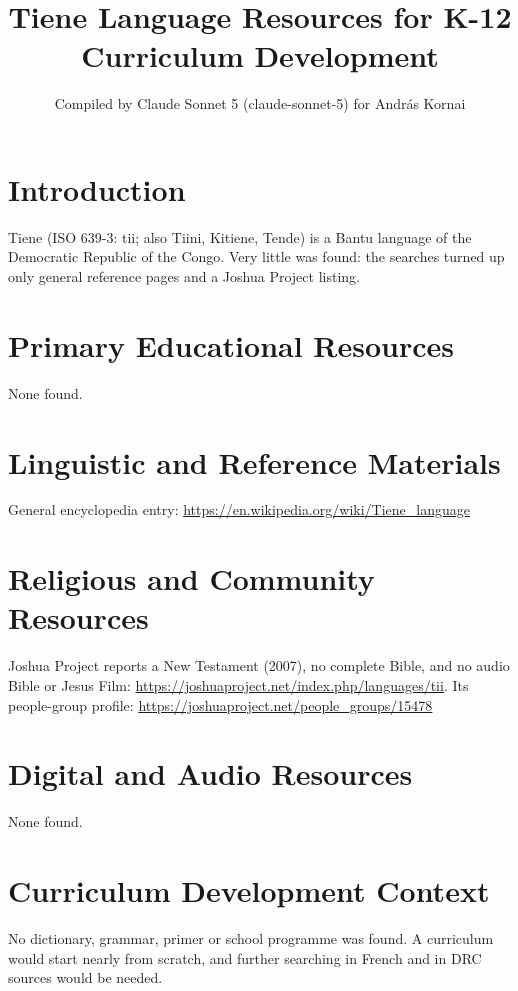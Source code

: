 \documentclass[12pt]{article}
\title{Tiene Language Resources for K-12 Curriculum Development}
\author{Compiled by Claude Sonnet 5 (claude-sonnet-5) for Andr\'as Kornai}
\date{}
\begin{document}
\maketitle

\section{Introduction}
Tiene (ISO 639-3: tii; also Tiini, Kitiene, Tende) is a Bantu language of the Democratic Republic of the Congo. Very little was found: the searches turned up only general reference pages and a Joshua Project listing.

\section{Primary Educational Resources}
None found.

\section{Linguistic and Reference Materials}
General encyclopedia entry: \url{https://en.wikipedia.org/wiki/Tiene_language}

\section{Religious and Community Resources}
Joshua Project reports a New Testament (2007), no complete Bible, and no audio Bible or Jesus Film: \url{https://joshuaproject.net/index.php/languages/tii}. Its people-group profile: \url{https://joshuaproject.net/people_groups/15478}

\section{Digital and Audio Resources}
None found.

\section{Curriculum Development Context}
No dictionary, grammar, primer or school programme was found. A curriculum would start nearly from scratch, and further searching in French and in DRC sources would be needed.
\end{document}
